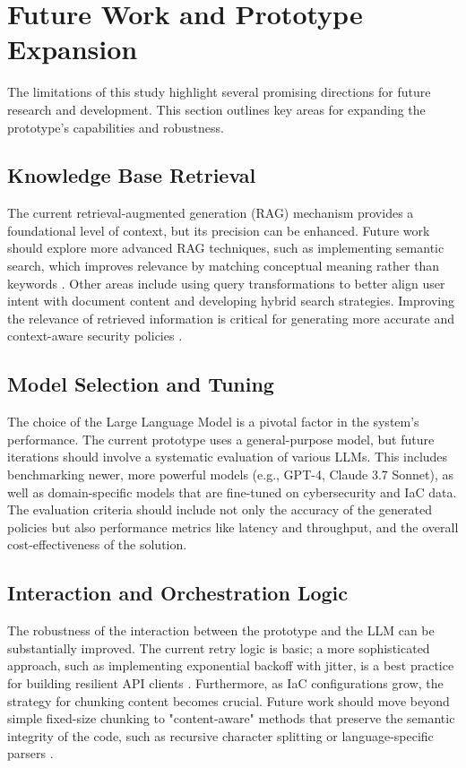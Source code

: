 \section{Future Work and Prototype Expansion}
\label{sec:future_work}

The limitations of this study highlight several promising directions for future research and development. This section outlines key areas for expanding the prototype's capabilities and robustness.

\subsection{Knowledge Base Retrieval}
The current retrieval-augmented generation (RAG) mechanism provides a foundational level of context, but its precision can be enhanced. Future work should explore more advanced RAG techniques, such as implementing semantic search, which improves relevance by matching conceptual meaning rather than keywords \cite{zoomin_benefits_2024}. Other areas include using query transformations to better align user intent with document content and developing hybrid search strategies. Improving the relevance of retrieved information is critical for generating more accurate and context-aware security policies \cite{openai_retrieval_2025}.

\subsection{Model Selection and Tuning}
The choice of the Large Language Model is a pivotal factor in the system's performance. The current prototype uses a general-purpose model, but future iterations should involve a systematic evaluation of various LLMs. This includes benchmarking newer, more powerful models (e.g., GPT-4, Claude 3.7 Sonnet), as well as domain-specific models that are fine-tuned on cybersecurity and IaC data. The evaluation criteria should include not only the accuracy of the generated policies but also performance metrics like latency and throughput, and the overall cost-effectiveness of the solution.

\subsection{Interaction and Orchestration Logic}
The robustness of the interaction between the prototype and the LLM can be substantially improved. The current retry logic is basic; a more sophisticated approach, such as implementing exponential backoff with jitter, is a best practice for building resilient API clients \cite{doordash_best_nodate}. Furthermore, as IaC configurations grow, the strategy for chunking content becomes crucial. Future work should move beyond simple fixed-size chunking to "content-aware" methods that preserve the semantic integrity of the code, such as recursive character splitting or language-specific parsers \cite{pinecone_chunking_2025}.

